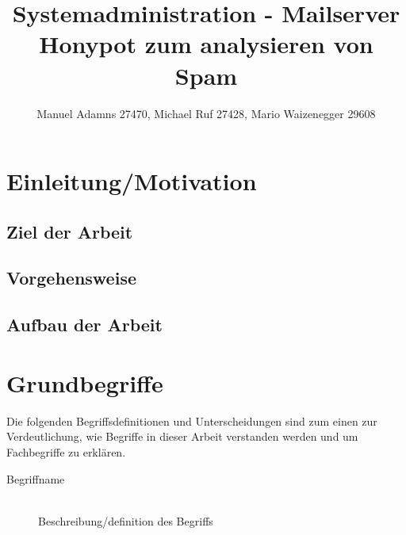 \documentclass[a4paper,11pt,singlespacing]{article}
\title{Systemadministration - Mailserver Honypot zum analysieren von Spam}
\author{Manuel Adamns 27470, Michael Ruf 27428, Mario Waizenegger 29608}
\begin{document}
\setlength{\parindent}{0ex}


\maketitle

\begin{abstract}

\end{abstract}


\newpage
\tableofcontents
\newpage


\section{Einleitung/Motivation}\label{sec:EinleitungMotivation}

	\subsection{Ziel der Arbeit}\label{Ziel}
	
	\subsection{Vorgehensweise}\label{sec:Vorgehensweise}

	\subsection{Aufbau der Arbeit}\label{sec:Aufbau}
	
	


\section{Grundbegriffe}\label{sec:Grundbegriffe}
	Die folgenden Begriffsdefinitionen und Unterscheidungen sind zum einen zur Verdeutlichung, wie Begriffe in dieser Arbeit verstanden werden und um Fachbegriffe zu erklären.
	
	\begin{description}
	
	\item[Begriffname\label{itm:BegriffReferenzname}]\hfill \\
	Beschreibung/definition des Begriffs \cite{BeispielBuch}
	
	\end{description}
	
\end{document}
